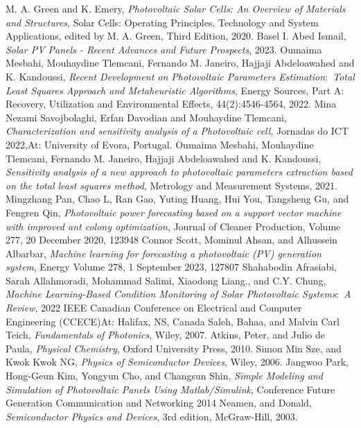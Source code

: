 \documentclass{report}
\begin{document}
\printindex
\begin{thebibliography}{9}
M. A. Green and K. Emery, \emph{Photovoltaic Solar Cells: An Overview of Materials and Structures}, Solar Cells: Operating Principles, Technology and System Applications, edited by M. A. Green, Third Edition, 2020.
Basel I. Abed Ismail, \emph{Solar PV Panels - Recent Advances and Future Prospects}, 2023.
Oumaima Mesbahi, Mouhaydine Tlemcani, Fernando M. Janeiro, Hajjaji Abdeloawahed and K. Kandoussi, \emph{Recent Development on Photovoltaic Parameters Estimation$:$ Total Least Squares Approach and Metaheuristic Algorithms}, Energy Sources, Part A: Recovery, Utilization and Environmental Effects, 44(2):4546-4564,  2022.
Mina Nezami Savojbolaghi, Erfan Davodian and Mouhaydine Tlemcani, \emph{Characterization and sensitivity analysis of a Photovoltaic cell}, Jornadas do ICT 2022,At: University of Evora, Portugal.
Oumaima Mesbahi, Mouhaydine Tlemcani, Fernando M. Janeiro, Hajjaji Abdeloawahed and K. Kandoussi, \emph{Sensitivity analysis of a new approach to photovoltaic parameters extraction based on the total least squares method}, Metrology and Measurement Systems, 2021.
Mingzhang Pan, Chao L, Ran Gao, Yuting Huang, Hui You, Tangsheng Gu, and Fengren Qin, \emph{Photovoltaic power forecasting based on a support vector machine with improved ant colony optimization}, Journal of Cleaner Production, Volume 277, 20 December 2020, 123948
Connor Scott, Mominul Ahsan, and Alhussein Albarbar, \emph{Machine learning for forecasting a photovoltaic (PV) generation system}, Energy Volume 278, 1 September 2023, 127807
Shahabodin Afrasiabi, Sarah Allahmoradi, Mohammad Salimi, Xiaodong Liang., and C.Y. Chung, \emph{Machine Learning-Based Condition Monitoring of Solar Photovoltaic Systems$:$ A Review}, 2022 IEEE Canadian Conference on Electrical and Computer Engineering (CCECE)At: Halifax, NS, Canada
Saleh, Bahaa, and Malvin Carl Teich, \emph{Fundamentals of Photonics}, Wiley, 2007.
Atkins, Peter, and Julio de Paula, \emph{Physical Chemistry}, Oxford University Press, 2010.
Simon Min Sze, and Kwok Kwok NG, \emph{Physics of Semiconductor Devices}, Wiley, 2006.
Jangwoo Park, Hong-Geun Kim, Yongyun Cho, and Changsun Shin, \emph{Simple Modeling and Simulation of Photovoltaic Panels Using Matlab/Simulink}, Conference Future Generation Communication and Networking 2014
Neamen, and Donald, \emph{Semiconductor Physics and Devices}, 3rd edition, McGraw-Hill, 2003.

\end{thebibliography}
\end{document}
